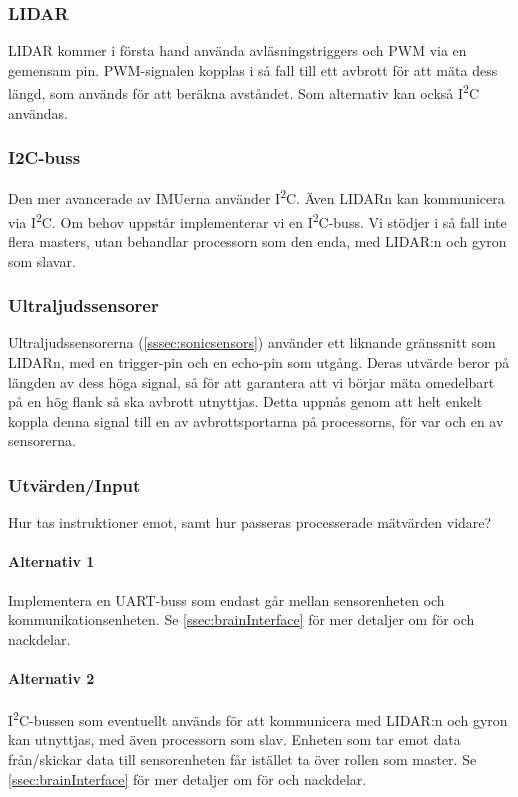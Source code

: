 \documentclass[a4paper,11pt]{article}
\begin{document}
\subsubsection{LIDAR}
LIDAR kommer i första hand använda avläsningstriggers och PWM via en gemensam pin. PWM-signalen kopplas i så fall till ett avbrott för att mäta dess längd, som används för att beräkna avståndet. Som alternativ kan också I\textsuperscript{2}C användas.

\subsubsection{I2C-buss}
Den mer avancerade av IMUerna använder I\textsuperscript{2}C. Även LIDARn kan kommunicera via I\textsuperscript{2}C. Om behov uppstår implementerar vi en I\textsuperscript{2}C-buss. Vi stödjer i så fall inte flera masters, utan behandlar processorn som den enda, med LIDAR:n och gyron som slavar.

\subsubsection{Ultraljudssensorer}
Ultraljudssensorerna (\ref{sssec:sonicsensors}) använder ett liknande gränssnitt som LIDARn, med en trigger-pin och en echo-pin som utgång. Deras utvärde beror på längden av dess höga signal, så för att garantera att vi börjar mäta omedelbart på en hög flank så ska avbrott utnyttjas. Detta uppnås genom att helt enkelt koppla denna signal till en av avbrottsportarna på processorns, för var och en av sensorerna.

\subsubsection{Utvärden/Input}
Hur tas instruktioner emot, samt hur passeras processerade mätvärden vidare?

\paragraph{Alternativ 1}
Implementera en UART-buss som endast går mellan sensorenheten och kommunikationsenheten. Se \ref{ssec:brainInterface} för mer detaljer om för och nackdelar.

\paragraph{Alternativ 2}
I\textsuperscript{2}C-bussen som eventuellt används för att kommunicera med LIDAR:n och gyron kan utnyttjas, med även processorn som slav. Enheten som tar emot data från/skickar data till sensorenheten får istället ta över rollen som master. Se \ref{ssec:brainInterface} för mer detaljer om för och nackdelar.
\end{document}
